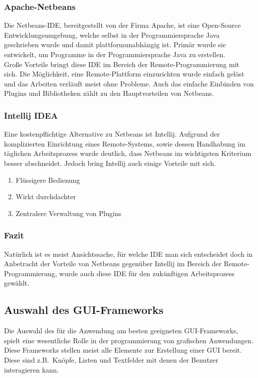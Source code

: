 \subsubsection{Apache-Netbeans}
Die Netbeans-IDE, bereitgestellt von der Firma Apache, ist eine Open-Source Entwicklungsumgebung, welche selbst in der Programmiersprache Java geschrieben wurde und damit plattformunabhängig ist.
Primär wurde sie entwickelt, um Programme in der Programmiersprache Java zu erstellen.\\
Große Vorteile bringt diese IDE im Bereich der Remote-Programmierung mit sich.
Die Möglichkeit, eine Remote-Plattform einzurichten wurde einfach gelöst und das Arbeiten verläuft meist ohne Probleme.
Auch das einfache Einbinden von Plugins und Bibliotheken zählt zu den Hauptvorteilen von Netbeans.
\subsubsection{Intellij IDEA}
Eine kostenpflichtige Alternative zu Netbeans ist Intellij.
Aufgrund der komplizierten Einrichtung eines Remote-Systems, sowie dessen Handhabung im täglichen Arbeitsprozess wurde deutlich, dass Netbeans im wichtigsten Kriterium besser abschneidet.
Jedoch bring Intellij auch einige Vorteile mit sich.
\begin{enumerate}
    \item Flüssigere Bedienung
    \item Wirkt durchdachter
    \item Zentralere Verwaltung von Plugins
\end{enumerate}
\subsubsection{Fazit}
Natürlich ist es meist Ansichtssache, für welche IDE man sich entscheidet doch in Anbetracht der Vorteile von Netbeans gegenüber Intellij im Bereich der Remote-Programmierung, wurde auch diese IDE für den zukünftigen Arbeitsprozess gewählt.
\subsection{Auswahl des GUI-Frameworks}\label{subsec:auswahl-des-gui-frameworks}
Die Auswahl des für die Anwendung am besten geeigneten GUI-Frameworks, spielt eine wesentliche Rolle in der programmierung von grafischen Anwendungen.
Diese Frameworks stellen meist alle Elemente zur Erstellung einer GUI bereit.
Diese sind z.B.\ Knöpfe, Listen und Textfelder mit denen der Benutzer interagieren kann.
